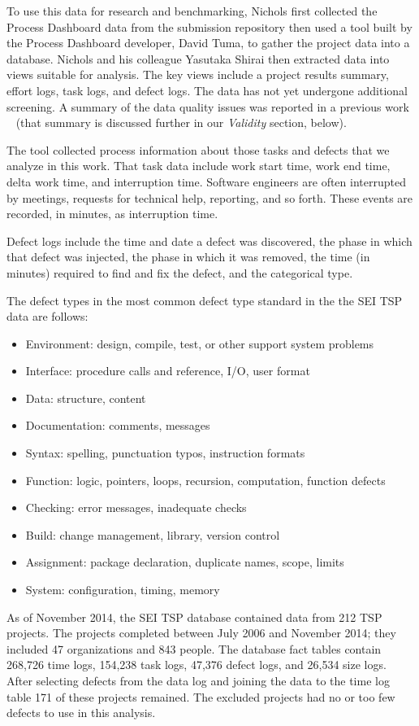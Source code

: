 To use this data for research and benchmarking,  Nichols first collected the Process Dashboard data from the submission repository then used a tool built by the Process Dashboard developer, David Tuma, 
to gather the project data into a database. Nichols and his colleague Yasutaka Shirai then extracted data into views suitable for analysis. The key views include a project results summary, effort logs, task logs, and defect logs. The data has not yet undergone additional screening. A summary of the data quality issues was reported in a previous work ~\cite{shirai14} (that summary is discussed further in our {\em Validity} section, below).

The tool collected process information about those tasks and defects that we analyze in this work. 
That task data include  work start time, work end time, delta
work time, and interruption time. Software engineers are often
interrupted by meetings, requests for technical help, reporting, and
so forth. These events are recorded, in minutes, as interruption
time. 

 Defect logs include the time and date a defect was discovered, the phase in which that defect was injected, the phase in which it was removed, the time (in minutes) required to find and fix the defect, and the categorical type.

The defect types in the most common defect type standard  in the the SEI TSP data are follows:
\begin{itemize}
\item Environment: design, compile, test, or other support system problems
\item Interface: procedure calls and reference, I/O, user format
\item Data: structure, content
\item Documentation: comments, messages
\item Syntax: spelling, punctuation typos, instruction formats
\item Function: logic, pointers, loops, recursion, computation, function defects  
\item Checking: error messages, inadequate checks
\item Build: change management, library, version control
\item Assignment: package
declaration, duplicate names, scope, limits
\item System: configuration, timing, memory
\end{itemize}


As of November 2014, the SEI TSP database contained data from 212
TSP projects. The projects completed between July 2006 and
November 2014; they included 47 organizations and 843 people. 
The database fact tables
contain 268,726 time logs, 
154,238 task logs,
 47,376 defect logs, 
and 26,534 size logs. 
After selecting defects from the data log and joining the data to the time log table  171 of these projects remained. The excluded projects had no or too few defects to use in this analysis.
 
